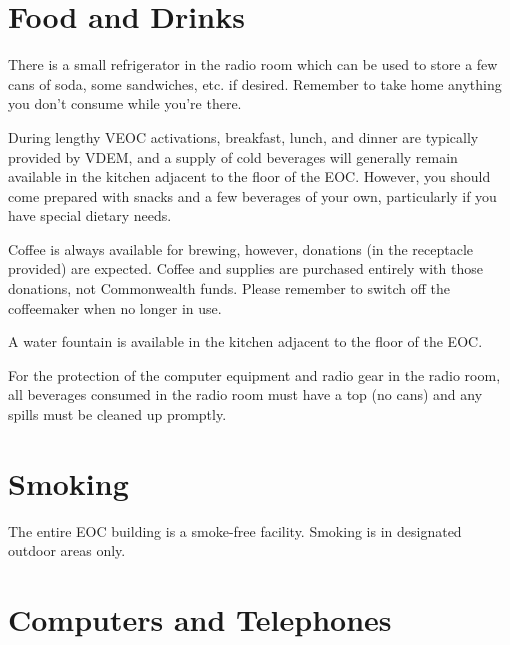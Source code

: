 \documentclass[pdflatex,letterpaper,twoside,12pt]{book}
\begin{document}

\section{Food and Drinks}

There is a small refrigerator in the radio room which can be used to store a few cans of soda, some sandwiches, etc. if desired.  Remember to take home anything you don't consume while you're there.

During lengthy VEOC activations, breakfast, lunch, and dinner are typically provided by VDEM, and a supply of cold beverages will generally remain available in the kitchen adjacent to the floor of the EOC.  However, you should come prepared with snacks and a few beverages of your own, particularly if you have special dietary needs.

Coffee is always available for brewing, however, donations (in the receptacle provided) are expected.  Coffee and supplies are purchased entirely with those donations, not Commonwealth funds.  Please remember to switch off the coffeemaker when no longer in use.

A water fountain is available in the kitchen adjacent to the floor of the EOC.

For the protection of the computer equipment and radio gear in the radio room, all beverages consumed in the radio room must have a top (no cans) and any spills must be cleaned up promptly.


\section{Smoking}

The entire EOC building is a smoke-free facility.  Smoking is in designated outdoor areas only.


\section{Computers and Telephones}
\end{document}
